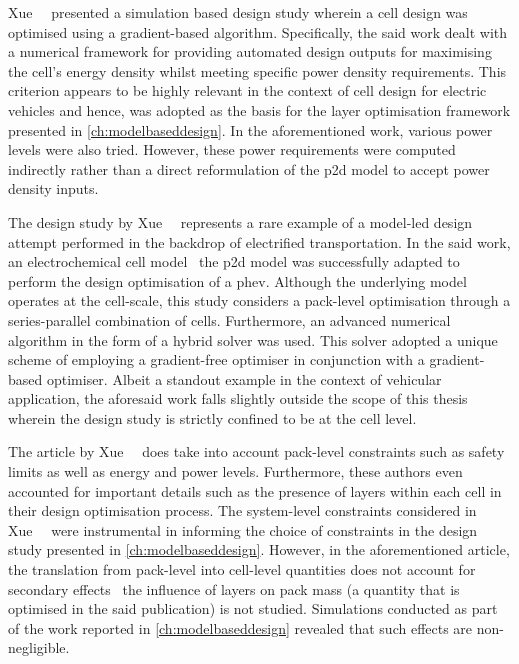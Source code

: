 Xue~\etal~\cite{Xue2013}  presented a  simulation based  design study  wherein a
cell design  was optimised using  a gradient-based algorithm.  Specifically, the
said  work dealt  with  a  numerical framework  for  providing automated  design
outputs for maximising  the cell's energy density whilst  meeting specific power
density  requirements. This  criterion  appears  to be  highly  relevant in  the
context of cell design for electric vehicles and hence, was adopted as the basis
for the layer optimisation framework presented in \cref{ch:modelbaseddesign}. In
the aforementioned  work, various power  levels were also tried.  However, these
power requirements were  computed indirectly rather than  a direct reformulation
of the \gls{p2d} model to accept power density inputs.

The  design   study  by  Xue~\etal~\cite{Xue2014}  represents   a  rare  example
of  a  model-led  design  attempt  performed  in  the  backdrop  of  electrified
transportation.  In  the  said  work, an  electrochemical  cell  model  \viz~the
\gls{p2d} model was successfully adapted to perform the design optimisation of a
\gls{phev}. Although the underlying model operates at the cell-scale, this study
considers  a  pack-level  optimisation  through  a  series-parallel  combination
of  cells.  Furthermore, an  advanced  numerical  algorithm  in  the form  of  a
hybrid  solver was  used. This  solver adopted  a unique  scheme of  employing a
gradient-free optimiser in conjunction with a gradient-based optimiser. Albeit a
standout example  in the  context of vehicular  application, the  aforesaid work
falls slightly  outside the  scope of  this thesis wherein  the design  study is
strictly confined  to be at  the cell level.


The  article  by Xue~\etal~\cite{Xue2014a}  does  take  into account  pack-level
constraints  such  as  safety  limits  as  well  as  energy  and  power  levels.
Furthermore,  these authors  even accounted  for important  details such  as the
presence  of layers  within  each  cell in  their  design optimisation  process.
The  system-level   constraints  considered  in   Xue~\etal~\cite{Xue2014}  were
instrumental  in  informing  the  choice  of constraints  in  the  design  study
presented in \cref{ch:modelbaseddesign}. However, in the aforementioned article,
the translation from pack-level into  cell-level quantities does not account for
secondary effects \ie~the  influence of layers on pack mass  (a quantity that is
optimised in the said publication) is not studied. Simulations conducted as part
of the  work reported in  \cref{ch:modelbaseddesign} revealed that  such effects
are non-negligible.

